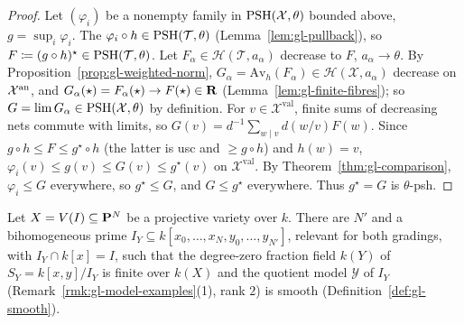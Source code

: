 \begin{proof}
Let $(\varphi_i)$ be a nonempty family in $\operatorname{PSH}(\mathcal X,\theta)$ bounded above, $g=\sup_i\varphi_i$. The $\varphi_i\circ h\in\operatorname{PSH}(\mathcal T,\theta)$
(Lemma~\ref{lem:gl-pullback}), so $F\coloneqq(g\circ h)^\star\in\operatorname{PSH}(\mathcal T,\theta)$. Let $F_\alpha\in\mathcal H(\mathcal T,a_\alpha)$ decrease to $F$,
$a_\alpha\to\theta$. By Proposition~\ref{prop:gl-weighted-norm}, $G_\alpha=\mathrm{Av}_h(F_\alpha)\in\mathcal H(\mathcal X,a_\alpha)$ decrease on $\mathcal X^{\mathrm{an}}$, and
$G_\alpha(\star)=F_\alpha(\star)\to F(\star)\in\mathbf{R}$ (Lemma~\ref{lem:gl-finite-fibres}); so $G=\lim G_\alpha\in\operatorname{PSH}(\mathcal X,\theta)$ by definition. For $v\in\mathcal
X^{\mathrm{val}}$, finite sums of decreasing nets commute with limits, so $G(v)=d^{-1}\sum_{w\mid v}d(w/v)F(w)$. Since $g\circ h\le F\le g^\star\circ h$ (the
latter is usc and $\ge g\circ h$) and $h(w)=v$, $\varphi_i(v)\le g(v)\le G(v)\le g^\star(v)$ on $\mathcal X^{\mathrm{val}}$. By Theorem~\ref{thm:gl-comparison},
$\varphi_i\le G$ everywhere, so $g^\star\le G$, and $G\le g^\star$ everywhere. Thus $g^\star=G$ is $\theta$-psh.
\end{proof}

\begin{theorem}\label{thm:gl-dejong}
\leanok
{}
Let $X=V(I)\subseteq\mathbf{P}^N$ be a projective variety over $k$. There are $N'$ and a bihomogeneous prime $I_Y\subseteq k[x_0,\dots,x_N,y_0,\dots,y_{N'}]$, relevant
for both gradings, with $I_Y\cap k[x]=I$, such that the degree-zero fraction field $k(Y)$ of $S_Y=k[x,y]/I_Y$ is finite over $k(X)$ and the quotient
model $\mathcal Y$ of $I_Y$ (Remark~\ref{rmk:gl-model-examples}(1), rank $2$) is smooth (Definition~\ref{def:gl-smooth}).
\end{theorem}

